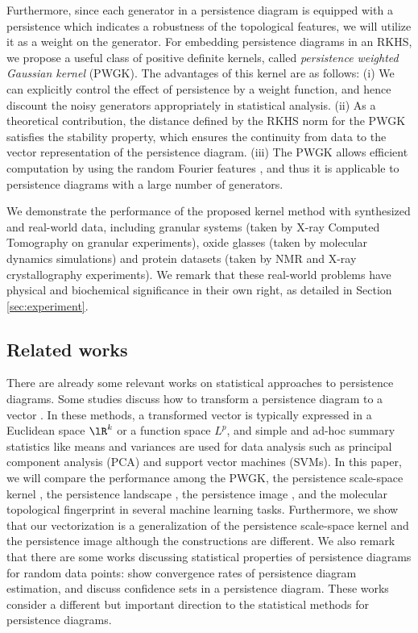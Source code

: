 \documentclass{article}
\begin{document}
Furthermore, since each generator in a persistence diagram is equipped with a persistence which indicates a robustness of the topological features, we will utilize it as a weight on the generator.
For embedding persistence diagrams in an RKHS, we propose a useful class of positive definite kernels, called {\em persistence weighted Gaussian kernel} (PWGK).
The advantages of this kernel are as follows:
(i) We can explicitly control the effect of persistence by a weight function, and hence discount the noisy generators appropriately in statistical analysis.
(ii) As a theoretical contribution, the distance defined by the RKHS norm for the PWGK satisfies the stability property, which ensures the continuity from data to the vector representation of the persistence diagram.
(iii) The PWGK allows efficient computation by using the random Fourier features \cite{RR07}, and thus it is applicable to persistence diagrams with a large number of generators.

We demonstrate the performance of the proposed kernel method with synthesized and real-world data, including granular systems (taken by X-ray Computed Tomography on granular experiments), oxide glasses (taken by molecular dynamics simulations) and protein datasets (taken by NMR and X-ray crystallography experiments).
We remark that these real-world problems have physical and biochemical significance in their own right, as detailed in Section \ref{sec:experiment}.

\subsection{Related works}
\label{subsec:related_work}

There are already some relevant works on statistical approaches to persistence diagrams.
Some studies discuss how to transform a persistence diagram to a vector \cite{AEKNPSCHMZ17, Bu15, CMWOXW15, COO15, RHBK15, RT16}.
In these methods, a transformed vector is typically expressed in a Euclidean space $\lR^{k}$ or a function space $L^{p}$, and simple and ad-hoc summary statistics like means and variances are used for data analysis such as principal component analysis (PCA) and support vector machines (SVMs).
In this paper, we will compare the performance among the PWGK, the persistence scale-space kernel \cite{RHBK15}, the persistence landscape \cite{Bu15}, the persistence image \cite{AEKNPSCHMZ17}, and the molecular topological fingerprint \cite{CMWOXW15} in several machine learning tasks.
Furthermore, we show that our vectorization is a generalization of the persistence scale-space kernel and the persistence image although the constructions are different.
We also remark that there are some works discussing statistical properties of persistence diagrams for random data points:
\cite{CGLM15} show convergence rates of persistence diagram estimation, and \cite{FLRWBS14} discuss confidence sets in a persistence diagram.
These works consider a different but important direction to the statistical methods for persistence diagrams.
\end{document}
